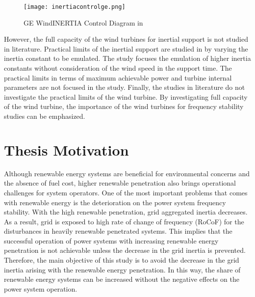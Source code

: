 \begin{figure}[h!]
	\centering
	\texttt{[image: inertiacontrolge.png]}
	\caption[GE WindINERTIA Control Diagram]{GE WindINERTIA Control Diagram in \cite{Clark2009}}
	\label{inertiacontrolge}
\end{figure}
However, the full capacity of the wind turbines for inertial support is not studied in literature. Practical limits of the inertial support are studied in \cite{Gonzalez-Longatt2016} by varying the inertia constant to be emulated. The study focuses the emulation of higher inertia constants without consideration of the wind speed in the support time. The practical limits in terms of maximum achievable power and turbine internal parameters are not focused in the study. Finally, the studies in literature do not investigate the practical limits of the wind turbine. By investigating full capacity of the wind turbine, the importance of the wind turbines for frequency stability studies can be emphasized. \newpage
\section{Thesis Motivation}
Although renewable energy systems are beneficial for environmental concerns and the absence of fuel cost, higher renewable penetration also brings operational challenges for system operators. One of the most important problems that comes with renewable energy is the deterioration on the power system frequency stability. With the high renewable penetration, grid aggregated inertia decreases. As a result, grid is exposed to high rate of change of frequency (RoCoF) for the disturbances in heavily renewable penetrated systems. This implies that the successful operation of power systems with increasing renewable energy penetration is not achievable unless the decrease in the grid inertia is prevented. Therefore, the main objective of this study is to avoid the decrease in the grid inertia arising with the renewable energy penetration. In this way, the share of renewable energy systems can be increased without the negative effects on the power system operation.

